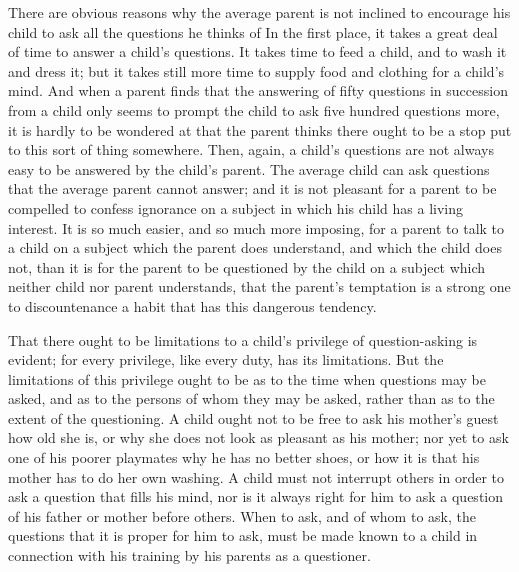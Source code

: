 \documentclass[
]{book}
\begin{document}
There are obvious reasons why the average parent is not inclined to encourage his child to ask all the questions he thinks of In the first place, it takes a great deal of time to answer a child's questions. It takes time to feed a child, and to wash it and dress it; but it takes still more time to supply food and clothing for a child's mind. And when a parent finds that the answering of fifty questions in succession from a child only seems to prompt the child to ask five hundred questions more, it is hardly to be wondered at that the parent thinks there ought to be a stop put to this sort of thing somewhere. Then, again, a child's questions are not always easy to be answered by the child's parent. The average child can ask questions that the average parent cannot answer; and it is not pleasant for a parent to be compelled to confess ignorance on a subject in which his child has a living interest. It is so much easier, and so much more imposing, for a parent to talk to a child on a subject which the parent does understand, and which the child does not, than it is for the parent to be questioned by the child on a subject which neither child nor parent understands, that the parent's temptation is a strong one to discountenance a habit that has this dangerous tendency.

That there ought to be limitations to a child's privilege of question-asking is evident; for every privilege, like every duty, has its limitations. But the limitations of this privilege ought to be as to the time when questions may be asked, and as to the persons of whom they may be asked, rather than as to the extent of the questioning. A child ought not to be free to ask his mother's guest how old she is, or why she does not look as pleasant as his mother; nor yet to ask one of his poorer playmates why he has no better shoes, or how it is that his mother has to do her own washing. A child must not interrupt others in order to ask a question that fills his mind, nor is it always right for him to ask a question of his father or mother before others. When to ask, and of whom to ask, the questions that it is proper for him to ask, must be made known to a child in connection with his training by his parents as a questioner.
\end{document}
